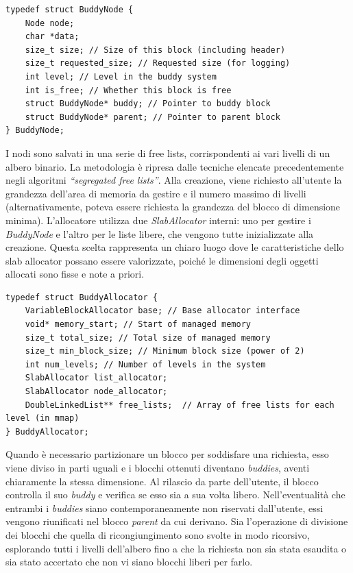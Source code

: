 \begin{lstlisting}
typedef struct BuddyNode {
    Node node;
    char *data;
    size_t size; // Size of this block (including header)
    size_t requested_size; // Requested size (for logging)
    int level; // Level in the buddy system
    int is_free; // Whether this block is free
    struct BuddyNode* buddy; // Pointer to buddy block
    struct BuddyNode* parent; // Pointer to parent block
} BuddyNode;
\end{lstlisting}

I nodi sono salvati in una serie di free lists, corrispondenti ai vari livelli di un albero binario. La metodologia è ripresa dalle tecniche elencate precedentemente negli algoritmi \textit{“segregated free lists”}. Alla creazione, viene richiesto all’utente la grandezza dell’area di memoria da gestire e il numero massimo di livelli (alternativamente, poteva essere richiesta la grandezza del blocco di dimensione minima). L'allocatore utilizza due \textit{SlabAllocator} interni: uno per gestire i \textit{BuddyNode} e l'altro per le liste libere, che vengono tutte inizializzate alla creazione. Questa scelta rappresenta un chiaro luogo dove le caratteristiche dello slab allocator possano essere valorizzate, poiché le dimensioni degli oggetti allocati sono fisse e note a priori.

\begin{lstlisting}
typedef struct BuddyAllocator {
    VariableBlockAllocator base; // Base allocator interface
    void* memory_start; // Start of managed memory
    size_t total_size; // Total size of managed memory
    size_t min_block_size; // Minimum block size (power of 2)
    int num_levels; // Number of levels in the system
    SlabAllocator list_allocator;
    SlabAllocator node_allocator;
    DoubleLinkedList** free_lists;  // Array of free lists for each level (in mmap)
} BuddyAllocator;
\end{lstlisting}


Quando è necessario partizionare un blocco per soddisfare una richiesta, esso viene diviso in parti uguali e i blocchi ottenuti diventano \textit{buddies}, aventi chiaramente la stessa dimensione. Al rilascio da parte dell’utente, il blocco controlla il suo \textit{buddy} e verifica se esso sia a sua volta libero.
Nell’eventualità che entrambi i \textit{buddies} siano contemporaneamente non riservati dall’utente, essi vengono riunificati nel blocco \textit{parent} da cui derivano. Sia l'operazione di divisione dei blocchi che quella di ricongiungimento sono svolte in modo ricorsivo, esplorando tutti i livelli dell'albero fino a che la richiesta non sia stata esaudita o sia stato accertato che non vi siano blocchi liberi per farlo. 

